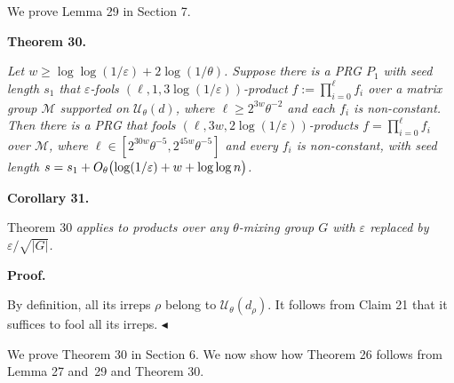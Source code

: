 


We prove Lemma 29 in Section 7.\par





\par\medskip\noindent\textbf{
\textbf{Theorem 30}\textbf{.}
}\par



\emph{Let $w\geq\log\log(1/\varepsilon)+2\log(1/\theta)$.
Suppose there is a PRG $P_{1}$ with seed length $s_{1}$ that $\varepsilon$-fools $(\ell,1,3\log(1/\varepsilon))$-product $f:=\prod_{i=0}^{\ell}f_{i}$ over a matrix group $\mathcal{M}$ supported on $\mathcal{U}_{\theta}(d)$, where $\ell\geq 2^{3w}\theta^{-2}$ and each $f_{i}$ is non-constant.
Then there is a PRG that fools $(\ell,3w,2\log(1/\varepsilon))$-products $f=\prod_{i=0}^{\ell}f_{i}$ over $\mathcal{M}$, where $\ell\in[2^{30w}\theta^{-5},2^{45w}\theta^{-5}]$ and every $f_{i}$ is non-constant, with seed length $s=s_{1}+O_{\theta}\bigl{(}\log(1/\varepsilon)+w+\log\log n\bigr{)}$.}\par







\par\medskip\noindent\textbf{
\textbf{Corollary 31}\textbf{.}
}\par



Theorem 30\emph{ applies to products over any $\theta$-mixing group $G$ with $\varepsilon$ replaced by $\varepsilon/\sqrt{\lvert G\rvert}$.}\par






\par\medskip\noindent\textbf{Proof.}\par




By definition, all its irreps $\rho$ belong to $\mathcal{U}_{\theta}(d_{\rho})$.
It follows from Claim 21 that it suffices to fool all its irreps.
$\blacktriangleleft$\par




We prove Theorem 30 in Section 6.
We now show how Theorem 26 follows from Lemma 27 and 29 and Theorem 30.\par





